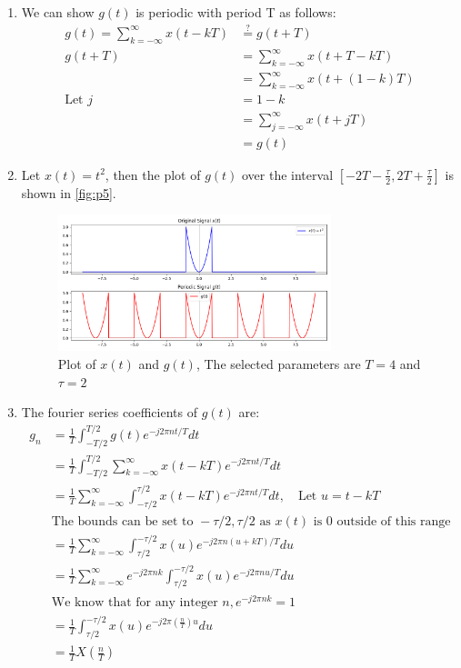 \documentclass{article}
\begin{document}
\begin{enumerate}[label=5.\arabic*]
    \item We can show $g(t)$ is periodic with period T as follows:
    \begin{align*}
        g(t) = \sum_{k=-\infty}^{\infty} x(t - kT) &\stackrel{?}{=} g(t + T) \\
        g(t+T) &= \sum_{k=-\infty}^{\infty} x(t + T - kT) \\
        &= \sum_{k=-\infty}^{\infty} x(t + (1-k)T) \\
        \text{Let } j &= 1-k \\
        &= \sum_{j=-\infty}^{\infty} x(t + jT) \\
        &= g(t)
    \end{align*}
    \item Let $x(t) = t^2$, then the plot of $g(t)$ over the interval $[-2T - \frac{\tau}{2}, 2T + \frac{\tau}{2}]$ is shown in \autoref{fig:p5}.

    \begin{figure}[ht!]
        \centering
        \includegraphics[width=0.75\textwidth]{p5.png}
        \caption{Plot of $x(t)$ and $g(t)$, The selected parameters are $T = 4$ and $\tau = 2$}
        \label{fig:p5}
    \end{figure}

    \item The fourier series coefficients of $g(t)$ are:
    \begin{align*}
        g_n &= \frac{1}{T} \int_{-T/2}^{T/2} g(t) e^{-j2\pi n t/T} dt \\
        &= \frac{1}{T} \int_{-T/2}^{T/2} \sum_{k=-\infty}^{\infty} x(t - kT) e^{-j2\pi n t/T} dt \\
        &= \frac{1}{T}\sum_{k=-\infty}^{\infty} \int_{-\tau/2}^{\tau/2} x(t - kT) e^{-j2\pi n t/T} dt, \quad \text{Let } u = t - kT \\
        &\text{The bounds can be set to } -\tau/2, \tau/2 \text{ as } x(t) \text{ is } 0 \text{ outside of this range} \\
        &= \frac{1}{T}\sum_{k=-\infty}^{\infty} \int_{\tau/2}^{-\tau/2} x(u) e^{-j2\pi n (u + kT)/T} du \\
        &= \frac{1}{T}\sum_{k=-\infty}^{\infty} e^{-j2\pi n k} \int_{\tau/2}^{-\tau/2} x(u) e^{-j2\pi n u/T} du \\
        &\text{We know that for any integer } n, e^{-j2\pi nk} = 1 \\
        &= \frac{1}{T}\int_{\tau/2}^{-\tau/2} x(u) e^{-j2\pi \left(\frac{n}{T}\right)u} du \\
        &= \frac{1}{T} X(\frac{n}{T})
    \end{align*}
\end{enumerate}
\end{document}

